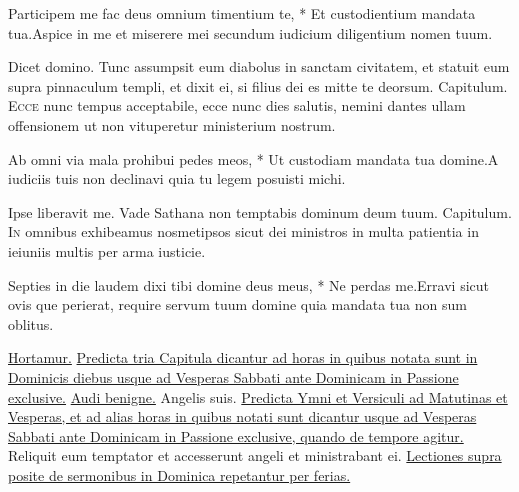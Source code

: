 \begin{multicols*}{2}
\begin{responsory-breve}[participem-me]
{Participem me fac deus omnium timentium te, * Et custodientium mandata tua.}{Aspice in me et miserere mei secundum iudicium diligentium nomen tuum.}
\end{responsory-breve}
\V Dicet domino.
 Tunc assumpsit eum diabolus in sanctam civitatem, et statuit eum supra pinnaculum templi, et dixit ei, si filius dei es mitte te deorsum. {\color{Red} Capitulum.}
\lettrine[lines=2]{\zallmancaps \color{Blue} E}{cce} nunc tempus acceptabile, ecce nunc dies salutis, nemini dantes ullam offensionem ut non vituperetur ministerium nostrum.
\begin{responsory-breve}
{Ab omni via mala prohibui pedes meos, * Ut custodiam mandata tua domine.}{A iudiciis tuis non declinavi quia tu legem posuisti michi.}
\end{responsory-breve}
\V Ipse liberavit me.
 Vade Sathana non temptabis dominum deum tuum. {\color{Red} Capitulum.}
\lettrine[lines=2]{\zallmancaps \color{Red} I}{n} omnibus exhibeamus nosmetipsos sicut dei ministros in multa patientia in ieiuniis multis per arma iusticie.
\begin{responsory-breve}
{Septies in die laudem dixi tibi domine deus meus, * Ne perdas me.}{Erravi sicut ovis que perierat, require servum tuum domine quia mandata tua non sum oblitus.}
\end{responsory-breve}
 \hyperlink{hortamur-vos}{Hortamur.}
\newline \ul{Predicta tria Capitula dicantur ad horas in quibus notata sunt in Dominicis diebus usque ad Vesperas Sabbati ante Dominicam in Passione exclusive.}
 \hyperlink{audi-benigne-conditor}{Audi benigne.} \V Angelis suis.
\newline \ul{Predicta Ymni et Versiculi ad Matutinas et Vesperas, et ad alias horas in quibus notati sunt dicantur usque ad Vesperas Sabbati ante Dominicam in Passione exclusive, quando de tempore agitur.}
 Reliquit eum temptator et accesserunt angeli et ministrabant ei.
\newline \ul{Lectiones supra posite de sermonibus in Dominica repetantur per ferias.}

\end{multicols*}
